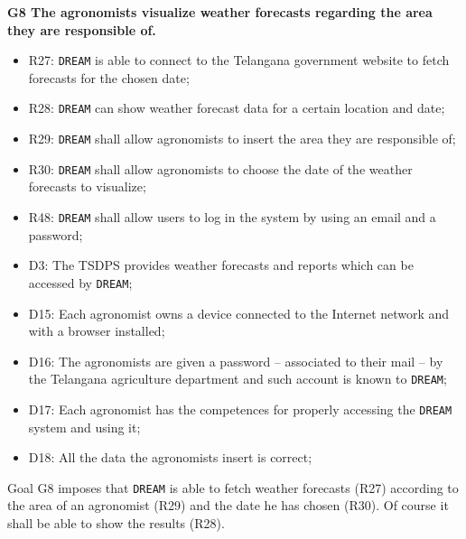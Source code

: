 \documentclass{article}
\begin{document}
\vspace{5mm}
\textbf{G8 The agronomists visualize weather forecasts regarding the area they are responsible of.}
\begin{itemize}
    \item R27: \verb|DREAM| is able to connect to the Telangana government website to fetch forecasts for the chosen date;

    \item R28: \verb|DREAM| can show weather forecast data for a certain location and date;

    \item R29: \verb|DREAM| shall allow agronomists to insert the area they are responsible of;

    \item R30: \verb|DREAM| shall allow agronomists to choose the date of the weather forecasts to visualize;
    
    \item R48: \verb|DREAM| shall allow users to log in the system by using an email and a password;
    
    \item D3: The TSDPS provides weather forecasts and reports which can be accessed by \verb|DREAM|;
    
    \item D15: Each agronomist owns a device connected to the Internet network and with a browser installed;

    \item D16: The agronomists are given a password – associated to their mail – by the Telangana agriculture department and such account is known to \verb|DREAM|;

    \item D17: Each agronomist has the competences for properly accessing the \verb|DREAM| system and using it;
  
    \item D18: All the data the agronomists insert is correct;

\end{itemize}
Goal G8 imposes that \verb|DREAM| is able to fetch weather forecasts (R27) according to the area of an agronomist (R29) and the date he has chosen (R30). Of course it shall be able to show the results (R28).
\end{document}
